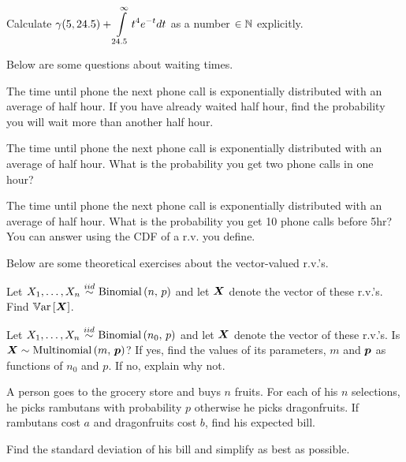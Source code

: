 \documentclass[12pt]{article}
\begin{document}
 Calculate $\gamma(5,24.5) + \displaystyle\int\displaylimits_{24.5}^\infty t^4 e^{-t}dt$ as a number $\in \mathbb{N}$ explicitly. 

\eenum

\problem Below are some questions about waiting times.


\benum

 The time until phone the next phone call is exponentially distributed with an average of half hour. If you have already waited half hour, find the probability you will wait more than another half hour. 

 The time until phone the next phone call is exponentially distributed with an average of half hour. What is the probability you get two phone calls in one hour? 

 The time until phone the next phone call is exponentially distributed with an average of half hour. What is the probability you get 10 phone calls before 5hr? You can answer using the CDF of a r.v. you define.

\eenum

\problem Below are some theoretical exercises about the vector-valued r.v.'s.


\benum
{} Let $\Xoneton \iid \binomial{n}{p}$ and let $\boldsymbol{X}$ denote the vector of these r.v.'s. Find $\mathbb{V}\text{ar}\left[\boldsymbol{X}\right]$. 

 Let $\Xoneton \iid \binomial{n_0}{p}$ and let $\boldsymbol{X}$ denote the vector of these r.v.'s. Is $\boldsymbol{X} \sim \mathrm{Multinomial}\left(m,\,\boldsymbol{p}\right)$? If yes, find the values of its parameters, $m$ and $\boldsymbol{p}$ as functions of $n_0$ and $p$. If no, explain why not. 

 A person goes to the grocery store and buys $n$ fruits. For each of his $n$ selections, he picks rambutans with probability $p$ otherwise he picks dragonfruits. If rambutans cost $a$ and dragonfruits cost $b$, find his expected bill. 

 Find the standard deviation of his bill and simplify as best as possible.
\eenum
\end{document}
